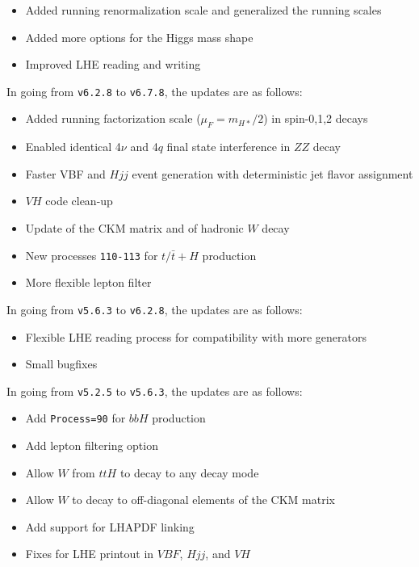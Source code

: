 \documentclass[aps,superscriptaddress,nofootinbib]{revtex4}
\begin{document}
\begin{itemize}
\item Added running renormalization scale and generalized the running scales
\item Added more options for the Higgs mass shape
\item Improved LHE reading and writing
\end{itemize}

\noindent
In going from \verb|v6.2.8| to \verb|v6.7.8|, the updates are as follows:

\begin{itemize}
\item Added running factorization scale ($\mu_F=m_{H*}/2$) in spin-0,1,2 decays
\item Enabled identical 4$\nu$ and 4$q$ final state interference in $ZZ$ decay
\item Faster VBF and $Hjj$ event generation with deterministic jet flavor assignment
\item $VH$ code clean-up
\item Update of the CKM matrix and of hadronic $W$ decay
\item New processes \verb|110-113| for $t/\bar{t}+H$ production
\item More flexible lepton filter
\end{itemize}

\noindent
In going from \verb|v5.6.3| to \verb|v6.2.8|, the updates are as follows:

\begin{itemize}
\item Flexible LHE reading process for compatibility with more generators
\item Small bugfixes
\end{itemize}

\noindent
In going from \verb|v5.2.5| to \verb|v5.6.3|, the updates are as follows:

\begin{itemize}
\item Add \verb|Process=90| for $bbH$ production
\item Add lepton filtering option
\item Allow $W$ from $ttH$ to decay to any decay mode
\item Allow $W$ to decay to off-diagonal elements of the CKM matrix
\item Add support for LHAPDF linking
\item Fixes for LHE printout in $VBF$, $Hjj$, and $VH$
\end{itemize}
\end{document}
